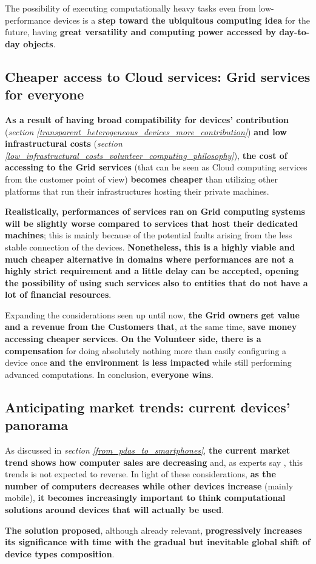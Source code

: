 The possibility of executing computationally heavy tasks even from low-performance devices is a \textbf{step toward the ubiquitous computing idea} for the future, having \textbf{great versatility and computing power accessed by day-to-day objects}.

\subsection{Cheaper access to Cloud services: Grid services for everyone}\label{cheaper_access_to_cloud_services}
\textbf{As a result of having broad compatibility for devices' contribution} (\textit{section \ref{transparent_heterogeneous_devices_more_contribution}}) \textbf{and low infrastructural costs} (\textit{section \ref{low_infrastructural_costs_volunteer_computing_philosophy}}), \textbf{the cost of accessing to the Grid services} (that can be seen as Cloud computing services from the customer point of view) \textbf{becomes cheaper} than utilizing other platforms that run their infrastructures hosting their private machines.

\textbf{Realistically, performances of services ran on Grid computing systems will be slightly worse compared to services that host their dedicated machines}; this is mainly because of the potential faults arising from the less stable connection of the devices. \textbf{Nonetheless, this is a highly viable and much cheaper alternative in domains where performances are not a highly strict requirement and a little delay can be accepted, opening the possibility of using such services also to entities that do not have a lot of financial resources}.

Expanding the considerations seen up until now, \textbf{the Grid owners get value and a revenue from the Customers that}, at the same time, \textbf{save money accessing cheaper services}. \textbf{On the Volunteer side, there is a compensation} for doing absolutely nothing more than easily configuring a device once \textbf{and the environment is less impacted} while still performing advanced computations. In conclusion, \textbf{everyone wins}. 

\subsection{Anticipating market trends: current devices' panorama}
As discussed in \textit{section \ref{from_pdas_to_smartphones}}, \textbf{the current market trend shows how computer sales are decreasing} and, as experts say \cite{smartphones_sales}, this trends is not expected to reverse. In light of these considerations, \textbf{as the number of computers decreases while other devices increase} (mainly mobile), \textbf{it becomes increasingly important to think computational solutions around devices that will actually be used}.

\textbf{The solution proposed}, although already relevant, \textbf{progressively increases its significance with time with the gradual but inevitable global shift of device types composition}.